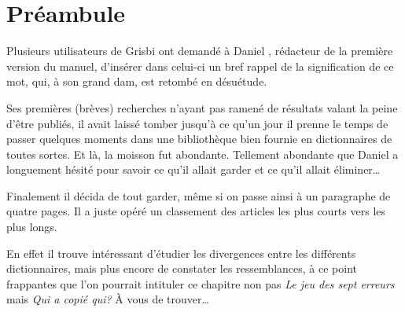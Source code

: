 

\chapter{Préambule\label{preamble}}


Plusieurs utilisateurs de \gls{Grisbi} ont demandé à Daniel , rédacteur de la première version du manuel, d'insérer dans celui-ci un bref rappel de la signification de ce mot, qui, à son grand dam, est retombé en désuétude.

Ses premières (brèves) recherches n'ayant pas ramené de résultats valant la peine d'être publiés, il avait laissé tomber jusqu'à ce qu'un jour il prenne le temps de passer quelques moments dans une bibliothèque bien fournie en dictionnaires de toutes sortes. Et là, la moisson fut abondante. Tellement abondante que Daniel  a longuement hésité pour savoir ce qu'il allait garder et ce qu'il allait éliminer\dots{} 

Finalement il décida de tout garder, même si on passe ainsi à un paragraphe de quatre pages. Il a juste opéré un classement des articles les plus courts vers les plus longs.

En effet il trouve intéressant d'étudier les divergences entre les différents dictionnaires, mais plus encore de constater les ressemblances, à ce point frappantes que l'on pourrait intituler ce chapitre non pas \emph{Le jeu des sept erreurs} mais \emph{Qui a copié qui?} À vous de trouver\dots{}

